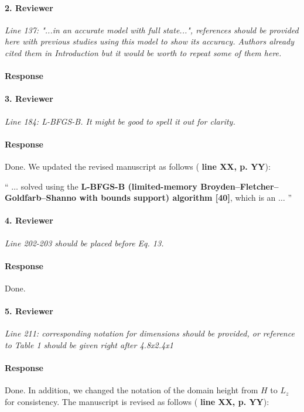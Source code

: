 \documentclass[]{article}
\newcommand{\red}[1]{\textbf{\color{red} #1}}
\newcommand{\revision}[1]{\textbf{#1}}
\begin{document}
\hrulefill

\paragraph{2. Reviewer} \textit{Line 137: "...in an accurate model with full state...", references should be provided here with previous studies using this model to show its accuracy. Authors already cited them in Introduction but it would be worth to repeat some of them here.}

\paragraph{Response} 

\hrulefill

\paragraph{3. Reviewer} \textit{Line 184: L-BFGS-B. It might be good to spell it out for clarity.}

\paragraph{Response} Done. We updated the revised manuscript as follows (\red{line XX, p. YY}):

`` 
$\dots$ solved using the \revision{L-BFGS-B (limited-memory Broyden--Fletcher--Goldfarb--Shanno with bounds support) algorithm [40]}, which is an $\dots$
''

\hrulefill

\paragraph{4. Reviewer} \textit{Line 202-203 should be placed before Eq. 13.}

\paragraph{Response} Done.

\hrulefill

\paragraph{5. Reviewer} \textit{Line 211: corresponding notation for dimensions should be provided, or reference to Table 1 should be given right after 4.8x2.4x1}

\paragraph{Response} Done. In addition, we changed the notation of the domain height from $H$ to $L_z$ for consistency. The manuscript is revised as follows (\red{line XX, p. YY}):
\end{document}
